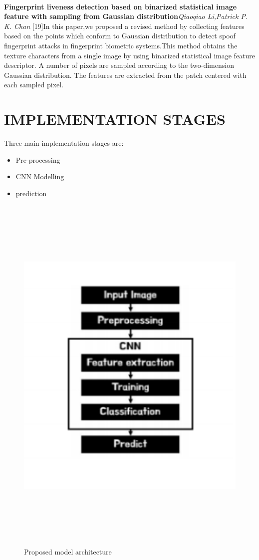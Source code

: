 \documentclass[a4paper,12pt,oneside]{article}
\begin{document}
\paragraph{}
\textbf{Fingerprint liveness detection based on binarized statistical image feature with sampling from Gaussian distribution}\textit{Qiaoqiao Li,Patrick P. K. Chan }[19]In this paper,we proposed a revised method by collecting features based on the points which conform to Gaussian
distribution to detect spoof fingerprint attacks in
fingerprint biometric systems.This method obtains the
texture characters from a single image by using binarized
statistical image feature descriptor. A number of pixels are
sampled according to the two-dimension Gaussian
distribution. The features are extracted from the patch
centered with each sampled pixel.




\newpage
\section{IMPLEMENTATION STAGES}
Three main implementation stages are:
\begin{itemize}
    \item Pre-processing
    \item  CNN Modelling
    \item prediction
\end{itemize}
\begin{figure}[H]
\centering
\includegraphics[height=18cm,width=15cm]{FLOWCHART.PNG}
\caption{Proposed model architecture} 
\end{figure}
\end{document}
